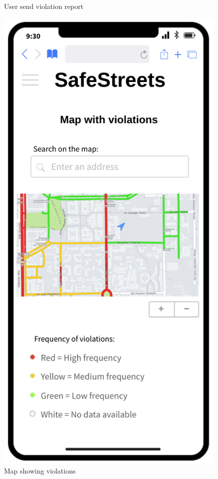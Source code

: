 \begin{figure}[H]
\begin{minipage}[b]{0.40\textwidth}
			\caption{User send violation report}
		\end{minipage}
		\hfill
		\begin{minipage}[b]{0.4\textwidth}
			\includegraphics[width=\textwidth]{Images/violationsMap.png}
			\caption{Map showing violations}
		\end{minipage}
	\end{figure}

